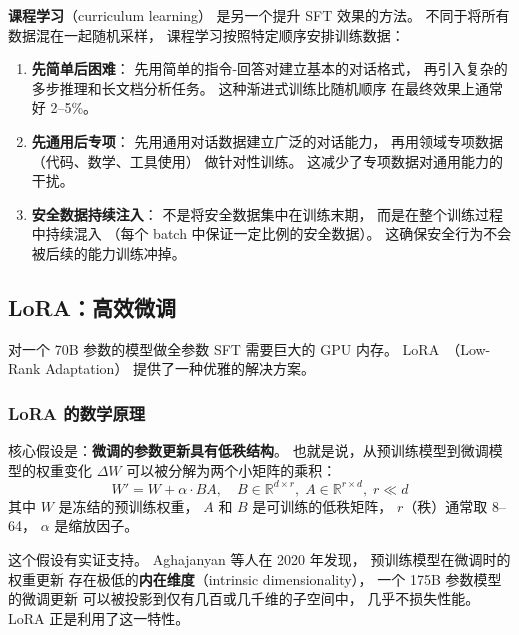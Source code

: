 \textbf{课程学习}（curriculum learning）
是另一个提升 SFT 效果的方法。
不同于将所有数据混在一起随机采样，
课程学习按照特定顺序安排训练数据：

\begin{enumerate}[noitemsep]
  \item \textbf{先简单后困难}：
        先用简单的指令-回答对建立基本的对话格式，
        再引入复杂的多步推理和长文档分析任务。
        这种渐进式训练比随机顺序
        在最终效果上通常好 2--5\%。
  \item \textbf{先通用后专项}：
        先用通用对话数据建立广泛的对话能力，
        再用领域专项数据（代码、数学、工具使用）
        做针对性训练。
        这减少了专项数据对通用能力的干扰。
  \item \textbf{安全数据持续注入}：
        不是将安全数据集中在训练末期，
        而是在整个训练过程中持续混入
       （每个 batch 中保证一定比例的安全数据）。
        这确保安全行为不会被后续的能力训练冲掉。
\end{enumerate}

\subsection{LoRA：高效微调}

对一个 70B 参数的模型做全参数 SFT 需要巨大的 GPU 内存。
LoRA~\cite{hu2021lora}（Low-Rank Adaptation）
提供了一种优雅的解决方案。

\subsubsection{LoRA 的数学原理}

核心假设是：\textbf{微调的参数更新具有低秩结构}。
也就是说，从预训练模型到微调模型的权重变化 $\Delta W$
可以被分解为两个小矩阵的乘积：
\begin{equation}
  W' = W + \alpha \cdot B A, \quad
  B \in \mathbb{R}^{d \times r}, \;
  A \in \mathbb{R}^{r \times d}, \;
  r \ll d
  \label{eq:lora}
\end{equation}
其中 $W$ 是冻结的预训练权重，
$A$ 和 $B$ 是可训练的低秩矩阵，
$r$（秩）通常取 8--64，
$\alpha$ 是缩放因子。

这个假设有实证支持。
Aghajanyan 等人在 2020 年发现，
预训练模型在微调时的权重更新
存在极低的\textbf{内在维度}（intrinsic dimensionality），
一个 175B 参数模型的微调更新
可以被投影到仅有几百或几千维的子空间中，
几乎不损失性能。
LoRA 正是利用了这一特性。


